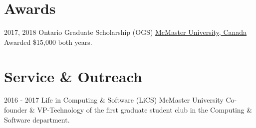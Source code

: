 \documentclass[letterpaper]{twentysecondcv} %
\begin{document}
\section{Awards}

\vspace{-.5em}
\begin{twenty}
  \twentyitem
  {2017,}
  {2018}
  {Ontario Graduate Scholarship (OGS)}
	{\href{https://www.mcmaster.ca/}{McMaster University, Canada}}
	{}
	{Awarded \$15,000 both years.}
\end{twenty}

\vspace{-.5em}
\section{Service \& Outreach}
\vspace{-.5em}
\begin{twenty}
	\twentyitem
	{2016 -}
	{2017}
	{Life in Computing \& Software (LiCS)}
	{McMaster University}
	{}
	{Co-founder \& VP-Technology of the first graduate student club in the Computing \& Software department.}
\end{twenty}

\end{document}
